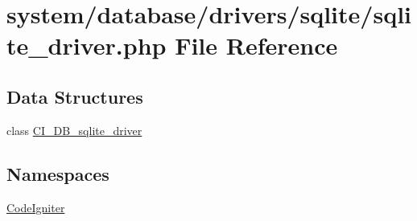 \hypertarget{sqlite__driver_8php}{\section{system/database/drivers/sqlite/sqlite\-\_\-driver.php File Reference}
\label{sqlite__driver_8php}
}
\subsection*{Data Structures}
\begin{DoxyCompactItemize}
\item 
class \hyperlink{class_c_i___d_b__sqlite__driver}{C\-I\-\_\-\-D\-B\-\_\-sqlite\-\_\-driver}
\end{DoxyCompactItemize}
\subsection*{Namespaces}
\begin{DoxyCompactItemize}
\item 
\hyperlink{namespace_code_igniter}{Code\-Igniter}
\end{DoxyCompactItemize}
